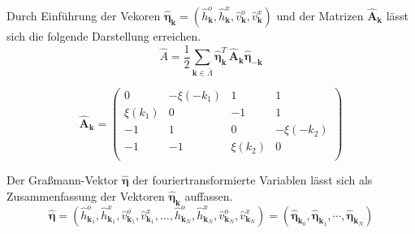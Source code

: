 \noindent Durch Einführung der Vekoren $\bm{\hat{\eta}}_{\bm{k}} = (\hat{h}_{\bm{k}}^{o}, \hat{h}_{\bm{k}}^{x}, \hat{v}_{\bm{k}}^{o}, \hat{v}_{\bm{k}}^{x} )$ und der Matrizen $\bm{\hat{A}}_{\bm{k}}$ lässt sich die folgende Darstellung erreichen. 
\begin{equation} \label{eq: Darstellung Wirkung}
    \hat{A} = \frac{1}{2} \sum_{\bm{k} \in \bar{\Lambda}} \bm{\hat{\eta}}_{\bm{k}}^T\, \bm{\hat{A}}_{\bm{k}} \bm{\hat{\eta}}_{-\bm{k}}
\end{equation}

\begin{equation}
    \bm{\hat{A}}_{\bm{k}} = \left(\begin{array}{cccc} 
        0         &-\xi(-k_1)  &  1       & 1        \\
        \xi(k_1)&0         &  -1       &  1        \\
        -1        &1        &  0       & -\xi(-k_2)  \\
        -1         &-1        &\xi(k_2)&  0        \\
    \end{array}\right) 
\end{equation}

\noindent Der Graßmann-Vektor $\bm{\hat{\eta}}$ der fouriertransformierte Variablen lässt sich als Zusammenfassung der Vektoren $\bm{\hat{\eta}}_{\bm{k}}$ auffassen.
\begin{equation}
\bm{\hat{\eta}} = \left(\hat{h}_{\bm{k}_1}^o, \hat{h}_{\bm{k}_1}^x, \hat{v}_{\bm{k}_1}^o, \hat{v}_{\bm{k}_1}^x, \dots, \hat{h}_{\bm{k}_N}^o, \hat{h}_{\bm{k}_N}^x, \hat{v}_{\bm{k}_N}^o, \hat{v}_{\bm{k}_N}^x \right) = \left(\bm{\hat{\eta}}_{\bm{k}_0}, \bm{\hat{\eta}}_{\bm{k}_1}, \cdots, \bm{\hat{\eta}}_{\bm{k}_N}  \right) \nonumber
\end{equation}

